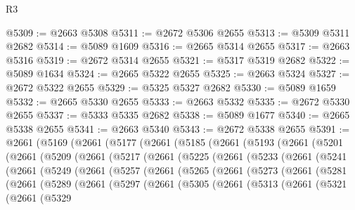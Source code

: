 \begin{lexlean}{R3}
\begin{coremodule}
@5309 := @2663 @5308
@5311 := @2672 @5306 @2655
@5313 := @5309 @5311 @2682
@5314 := @5089 @1609
@5316 := @2665 @5314 @2655
@5317 := @2663 @5316
@5319 := @2672 @5314 @2655
@5321 := @5317 @5319 @2682
@5322 := @5089 @1634
@5324 := @2665 @5322 @2655
@5325 := @2663 @5324
@5327 := @2672 @5322 @2655
@5329 := @5325 @5327 @2682
@5330 := @5089 @1659
@5332 := @2665 @5330 @2655
@5333 := @2663 @5332
@5335 := @2672 @5330 @2655
@5337 := @5333 @5335 @2682
@5338 := @5089 @1677
@5340 := @2665 @5338 @2655
@5341 := @2663 @5340
@5343 := @2672 @5338 @2655
@5391 := @2661
    (@5169
      (@2661
        (@5177
          (@2661
            (@5185
              (@2661
                (@5193
                  (@2661
                    (@5201
                      (@2661
                        (@5209
                          (@2661
                            (@5217
                              (@2661
                                (@5225
                                  (@2661
                                    (@5233
                                      (@2661
                                        (@5241
                                          (@2661
                                            (@5249
                                              (@2661
                                                (@5257
                                                  (@2661
                                                    (@5265
                                                      (@2661
                                                        (@5273
                                                          (@2661
                                                            (@5281
                                                              (@2661
                                                                (@5289
                                                                  (@2661
                                                                    (@5297
                                                                      (@2661
                                                                        (@5305
                                                                          (@2661
                                                                            (@5313
                                                                              (@2661
                                                                                (@5321
                                                                                  (@2661
                                                                                    (@5329

\end{coremodule}
\end{lexlean}
